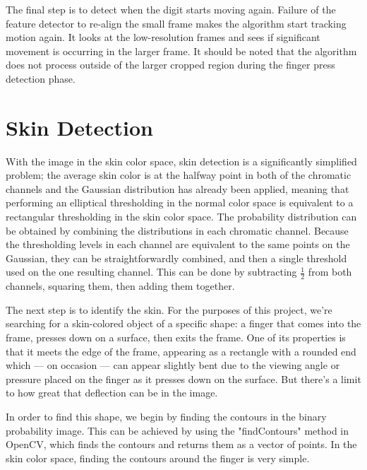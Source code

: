 The final step is to detect when the digit starts moving again. Failure of the feature detector to re-align the small frame makes the algorithm start tracking motion again. It looks at the low-resolution frames and sees if significant movement is occurring in the larger frame. It should be noted that the algorithm does not process outside of the larger cropped region during the finger press detection phase.

\section{Skin Detection}\label{sec:SkinDetection}

With the image in the skin color space, skin detection is a significantly simplified problem; the average skin color is at the halfway point in both of the chromatic channels and the Gaussian distribution has already been applied, meaning that performing an elliptical thresholding in the normal color space is equivalent to a rectangular thresholding in the skin color space. The probability distribution can be obtained by combining the distributions in each chromatic channel. Because the thresholding levels in each channel are equivalent to the same points on the Gaussian, they can be straightforwardly combined, and then a single threshold used on the one resulting channel. This can be done by subtracting $\frac{1}{2}$ from both channels, squaring them, then adding them together.

The next step is to identify the skin. For the purposes of this project, we're searching for a skin-colored object of a specific shape: a finger that comes into the frame, presses down on a surface, then exits the frame. One of its properties is that it meets the edge of the frame, appearing as a rectangle with a rounded end which --- on occasion --- can appear slightly bent due to the viewing angle or pressure placed on the finger as it presses down on the surface. But there's a limit to how great that deflection can be in the image.

In order to find this shape, we begin by finding the contours in the binary probability image. This can be achieved by using the "findContours" method in OpenCV, which finds the contours and returns them as a vector of points. In the skin color space, finding the contours around the finger is very simple.

